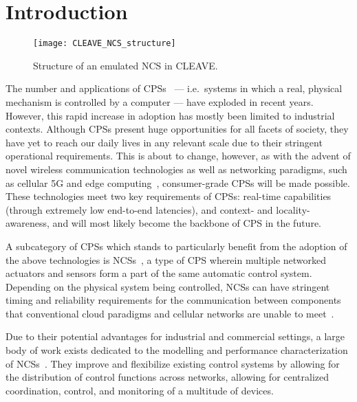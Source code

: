 \section{Introduction}\label{sec:intro}

\begin{figure*}
    \centering
    \texttt{[image: CLEAVE\_NCS\_structure]}
    \caption{
        Structure of an emulated \acl*{NCS} in \acs*{CLEAVE}.
    }\label{fig:cleave:ncs:struct}
\end{figure*}

The number and applications of \acp{CPS}~\cite{Rajkumar2010CPS} --- i.e.\ systems in which a real, physical mechanism is controlled by a computer --- have exploded in recent years.
However, this rapid increase in adoption has mostly been limited to industrial contexts.
Although \acp{CPS} present huge opportunities for all facets of society, they have yet to reach our daily lives in any relevant scale due to their stringent operational requirements.
This is about to change, however, as with the advent of novel wireless communication technologies as well as networking paradigms, such as cellular 5G and edge computing~\cite{Satya2017Emergence}, consumer-grade \acp{CPS} will be made possible.
These technologies meet two key requirements of \acp{CPS}: real-time capabilities (through extremely low end-to-end latencies), and context- and locality-awareness, and will most likely become the backbone of \ac{CPS} in the future.

A subcategory of \acp{CPS} which stands to particularly benefit from the adoption of the above technologies is \acp{NCS}~\cite{Gupta2010NCSOverview}, a type of \ac{CPS} wherein multiple networked actuators and sensors form a part of the same automatic control system.
Depending on the physical system being controlled, \acp{NCS} can have stringent timing and reliability requirements for the communication between components that conventional cloud paradigms and cellular networks are unable to meet~\cite{Wan2020Efficient}.

Due to their potential advantages for industrial and commercial settings, a large body of work exists dedicated to the modelling and performance characterization of \acp{NCS}~\cite{Zhang2013Survey,Zhang2016Survey}.
They improve and flexibilize existing control systems by allowing for the distribution of control functions across networks, allowing for centralized coordination, control, and monitoring of a multitude of devices.

